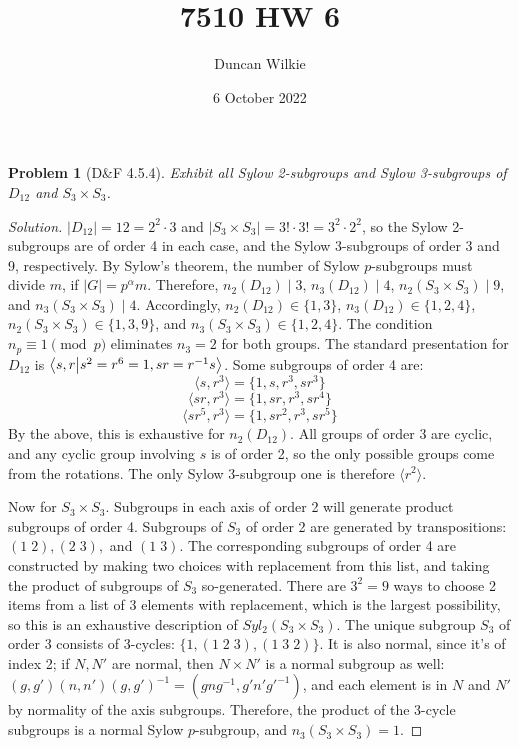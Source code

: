 \documentclass{article}
\title{7510 HW 6}
\author{Duncan Wilkie}
\date{6 October 2022}
\newtheorem{problem}{Problem}
\begin{document}
\maketitle

\begin{problem}[D\&F 4.5.4]
  Exhibit all Sylow 2-subgroups and Sylow 3-subgroups of $D_{12}$ and $S_{3} \times S_{3}$.
\end{problem}

\begin{proof}[Solution]
  $|D_{12}| = 12 = 2^{2}\cdot 3$ and $|S_{3}\times S_{3}| = 3! \cdot 3! = 3^{2}\cdot 2^{2}$,
  so the Sylow 2-subgroups are of order 4 in each case, and the Sylow 3-subgroups of order 3 and 9, respectively.
  By Sylow's theorem, the number of Sylow $p$-subgroups must divide $m$, if $|G| = p^{\alpha}m$.
  Therefore, $n_{2}(D_{12}) \mid 3$, $n_{3}(D_{12}) \mid 4$, $n_{2}(S_{3} \times S_{3}) \mid 9$, and $n_{3}(S_{3} \times S_{3}) \mid 4$.
  Accordingly, $n_{2}(D_{12}) \in \{1, 3\}$,  $n_{3}(D_{12}) \in \{1, 2, 4\}$, $n_{2}(S_{3} \times S_{3}) \in \{1, 3, 9\}$,
  and $n_{3}(S_{3} \times S_{3}) \in \{1, 2, 4\}$.
  The condition $n_{p} \equiv 1 \pmod p$ eliminates $n_{3} = 2$ for both groups.
  The standard presentation for $D_{12}$ is $\braket{s, r}{s^{2}=r^{6}=1, sr=r^{-1}s}$.
  Some subgroups of order 4 are:
  \[
    \langle s, r ^{3} \rangle = \{1, s, r^{3}, sr^{3}\}
  \]
  \[
    \langle sr, r^{3} \rangle = \{1, sr, r^{3}, sr^{4}\}
  \]
  \[
    \langle sr^{5}, r^{3}\rangle = \{1, sr^{2}, r^{3}, sr^{5}\}
  \]
  By the above, this is exhaustive for $n_{2}(D_{12})$.
  All groups of order 3 are cyclic, and any cyclic group involving $s$ is of order 2, so the only possible groups come from the rotations.
  The only Sylow 3-subgroup one is therefore $\langle r^{2} \rangle$.

  Now for $S_{3} \times S_{3}$.
  Subgroups in each axis of order 2 will generate product subgroups of order 4.
  Subgroups of $S_{3}$ of order 2 are generated by transpositions: $(1 \; 2), (2 \; 3),$ and $(1 \; 3)$.
  The corresponding subgroups of order 4 are constructed by making two choices with replacement from this list,
  and taking the product of subgroups of $S_{3}$ so-generated.
  There are $3^{2} = 9$ ways to choose 2 items from a list of 3 elements with replacement, which is the largest possibility,
  so this is an exhaustive description of $Syl_{2}(S_{3} \times S_{3})$.
  The unique subgroup $S_{3}$ of order 3 consists of 3-cycles: $\{1, (1 \; 2 \; 3), (1 \; 3 \; 2)\}$.
  It is also normal, since it's of index 2; if $N, N'$ are normal, then $N \times N'$ is a normal subgroup as well:
  $(g, g')(n, n')(g, g')^{-1} = (gng^{-1}, g'n'g'^{-1})$, and each element is in $N$ and $N'$ by normality of the axis subgroups.
  Therefore, the product of the 3-cycle subgroups is a normal Sylow $p$-subgroup, and $n_{3}(S_{3} \times S_{3}) = 1$.
\end{proof}
\end{document}

